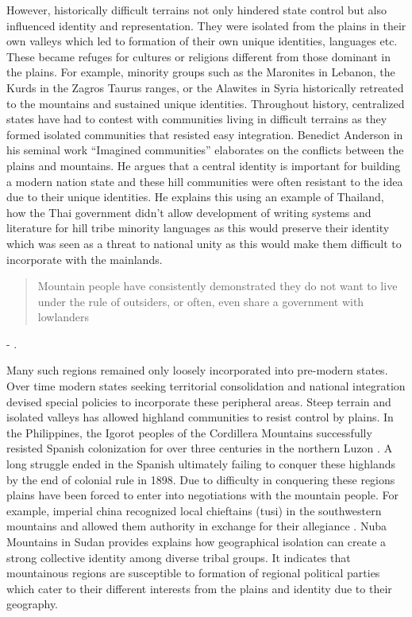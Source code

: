 \begin{sloppypar}
\vspace{0.3cm}

However, historically difficult terrains not only hindered state control but also influenced identity and representation. They were isolated from the plains in their own valleys which led to formation of their own unique identities, languages etc. These became refuges for cultures or religions different from those dominant in the plains. For example, minority groups such as the Maronites in Lebanon, the Kurds in the Zagros Taurus ranges, or the Alawites in Syria historically retreated to the mountains and sustained unique identities.
 Throughout history, centralized states have had to contest with communities living in difficult terrains as they formed isolated communities that resisted easy integration. Benedict Anderson in his seminal work ``Imagined communities'' elaborates on the conflicts between the plains and mountains. He argues that a central identity is important for building a modern nation state and these hill communities were often resistant to the idea due to their unique identities. He explains this using an example of Thailand, how the Thai government didn't allow development of writing systems and literature for hill tribe minority languages as this would preserve their identity which was seen as a threat to national unity \citep{anderson1991imagined} as this would make them difficult to incorporate with the mainlands.  \begin{quote} Mountain people have consistently demonstrated they do not want to live under the rule of outsiders, or often, even share a government with lowlanders\end{quote} 

\hspace*{\fill} - \cite{Hammes2017}. 



Many such regions remained only loosely incorporated into pre-modern states. Over time modern states seeking territorial consolidation and national integration devised special policies to incorporate these peripheral areas. Steep terrain and isolated valleys has allowed highland communities to  resist control by plains. In the Philippines, the Igorot peoples of the Cordillera Mountains successfully resisted Spanish colonization for over three centuries in the northern Luzon \citep{scott1970igorot}. A long struggle ended in the Spanish ultimately failing to conquer these highlands by the end of colonial rule in 1898. Due to difficulty in conquering these regions plains have been forced to enter into negotiations with the mountain people. For example, imperial china  recognized local chieftains (tusi) in the southwestern mountains and allowed them authority in exchange for their allegiance \citep{took2005native}. Nuba Mountains in Sudan provides explains how geographical isolation can create a strong collective identity among diverse tribal groups. It indicates that mountainous regions are susceptible to formation of regional political parties which cater to their different interests from the plains and identity due to their geography.


\end{sloppypar}
